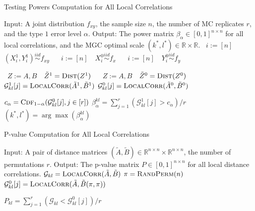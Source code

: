 \documentclass[11pt]{article}
\newcommand{\Real}{\mathbb{R}}
\newcommand{\G}{\mathcal{G}}
\newcommand{\Linefor}[2]{%
    \State \algorithmicfor\ {#1}\ \algorithmicdo\ {#2} \algorithmicend\ \algorithmicfor%
}
\begin{document}
\begin{algorithm}
\caption{Testing Powers Computation for All Local Correlations}
\label{alg3}
\begin{algorithmic}[1]
\Statex Input: A joint distribution $f_{xy}$, the sample size $n$, the number of MC replicates $r$, and the type $1$ error level $\alpha$.
\Statex Output: The power matrix $\beta_{\alpha} \in [0,1]^{n \times n}$ for all local correlations, and the MGC optimal scale $(k^{*},l^{*}) \in \Real \times \Real$.
\Linefor{$i:=[n]$}{$(X^{1}_{i},Y^{1}_{i}) \stackrel{iid}{\sim} f_{xy}$} 
\Linefor{$i:=[n]$}{$X^{0}_{i} \stackrel{iid}{\sim} f_{x}$} 
\Linefor{$i:=[n]$}{$Y^{0}_{i} \stackrel{iid}{\sim} f_{y}$} 
\Linefor{$Z:=A,B$}{$\tilde{Z}^{1}=\textsc{Dist}(Z^{1})$} 
\Linefor{$Z:=A,B$}{$\tilde{Z}^{0}=\textsc{Dist}(Z^{0})$} 
\State $\G_{kl}^{1}[j]=\textsc{LocalCorr}(\tilde{A}^{1},\tilde{B}^{1})$  
\State $\G_{kl}^{0}[j]=\textsc{LocalCorr}(\tilde{A}^{0},\tilde{B}^{0})$  
\EndFor

\State $c_{\alpha}=\textsc{Cdf}_{1-\alpha}(\G^{0}_{kl}[j],j \in [r])$ 
\State $\beta_{\alpha}^{kl}=\sum_{j=1}^{r}(\G^{1}_{kl}[j]>c_{\alpha}) / r$ 
\EndFor
\State $(k^{*},l^{*})=\arg\max(\beta_{\alpha}^{kl})$ 
\EndFunction
\end{algorithmic}
\end{algorithm}

\begin{algorithm}
\caption{P-value Computation for All Local Correlations}
\label{alg4}
\begin{algorithmic}[1]
\Statex Input: A pair of distance matrices $(\tilde{A},\tilde{B}) \in \Real^{n \times n} \times \Real^{n \times n}$, the number of permutations $r$.
\Statex Output: The p-value matrix $P \in [0,1]^{n \times n}$ for all local distance correlations.
\State $\G_{kl}=\textsc{LocalCorr}(\tilde{A},\tilde{B})$ 
\State $\pi=\textsc{RandPerm}(n)$ 
\State $\G_{kl}^{0}[j]=\textsc{LocalCorr}(\tilde{A},\tilde{B}(\pi,\pi))$ 
\EndFor

\State $P_{kl}=\sum_{j=1}^{r}(\G_{kl}<\G^{0}_{kl}[j])/r$ 
\EndFor
\EndFunction
\end{algorithmic}
\end{algorithm}
\end{document}
